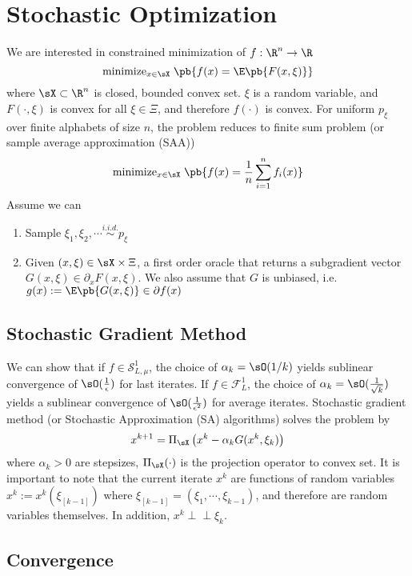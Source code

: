 \documentclass[11pt]{article}
\newcommand{\indep}{\perp \!\!\! \perp}
\newcommand\scrF{\ensuremath{\mathscr{F}}}
\newcommand\scrS{\ensuremath{\mathscr{S}}}
\begin{document}
\section{Stochastic Optimization}

We are interested in constrained minimization of $f:\R^n\to\R$ 
\[
    \text{minimize}_{x\in\sX}\; \pb{
        f(x) = \E\pb{F(x,\xi)}
    }
\]
where $\sX \subset \R^n$ is closed, bounded convex set. $\xi$ is a random variable, and $F(\cdot,\xi)$ is convex for all $\xi\in\Xi$, and therefore $f(\cdot)$ is convex. For uniform $p_{\xi}$ over finite alphabets of size $n$, the problem reduces to finite sum problem (or sample average approximation (SAA))
\[
    \text{minimize}_{x\in\sX}\; \pb{
        f(x) = \frac{1}{n} \sum_{i=1}^n f_i(x)
    }    
\]
Assume we can
\begin{enumerate}
    \item Sample $\xi_1,\xi_2,\cdots \overset{i.i.d.}{\sim} p_{\xi}$
    \item Given $(x,\xi)\in\sX\times\Xi$, a first order oracle that returns a subgradient vector $G(x,\xi) \in\partial_x F(x,\xi)$. We also assume that $G$ is unbiased, i.e. $g(x) := \E\pb{G(x,\xi)}\in\partial f(x)$
\end{enumerate}

\subsection{Stochastic Gradient Method}


We can show that if $f\in\scrS_{L,\mu}^1$, the choice of $\alpha_k = \sO(1/k)$ yields sublinear convergence of $\sO(\frac{1}{\epsilon})$ for last iterates. If $f\in\scrF_{L}^1$, the choice of $\alpha_k=\sO(\frac{1}{\sqrt{k}})$ yields a sublinear convergence of $\sO(\frac{1}{\epsilon^2})$ for average iterates. Stochastic gradient method (or Stochastic Approximation (SA) algorithms) solves the problem by 
\[
    x^{k+1} = \Pi_{\sX}\left( x^k - \alpha_k G(x^k, \xi_k) \right)    
\]
where $\alpha_k > 0$ are stepsizes, $\Pi_{\sX}(\cdot)$ is the projection operator to convex set. It is important to note that the current iterate $x^k$ are functions of random variables $x^k := x^k(\xi_{[k-1]})$ where $\xi_{[k-1]} = (\xi_1,\cdots,\xi_{k-1})$, and therefore are random variables themselves. In addition, $x^k \indep \xi_k$. 

\subsection{Convergence}
\end{document}
